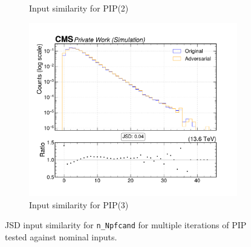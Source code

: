 \begin{figure}[htbp]
\begin{subfigure}[t]{0.32\textwidth}
    \caption{Input similarity for PIP(2)}
  \end{subfigure}\hfill
  \begin{subfigure}[t]{0.32\textwidth}
    \includegraphics[width=\linewidth]{media/output/features/compare/intprob_3/cmp_global_features_n_Npfcand.pdf}
    \caption{Input similarity for PIP(3)}
  \end{subfigure}

  \caption{JSD input similarity for \texttt{n\_Npfcand} for multiple iterations of PIP tested against nominal inputs.}
  \label{fig:intprob_input_n_Npfcand}
\end{figure}

